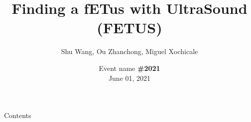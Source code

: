 \documentclass[xcolor={dvipsnames},aspectratio=169,10pt]{beamer}
\title{Finding a fETus with UltraSound (FETUS)}
\author{
Shu Wang,
Ou Zhanchong,
Miguel Xochicale
}
\date{
Event name {\bf \#2021} \\
June 01, 2021
}
\institute{
	\faEnvelope   e-mail@server.com \\
	\faGithubAlt @githubhandler \faTwitter @twitterhandler
		}
\begin{document}
\maketitle

\begin{frame}{Contents}
    \tableofcontents
\end{frame}







\maketitle
\end{document}
